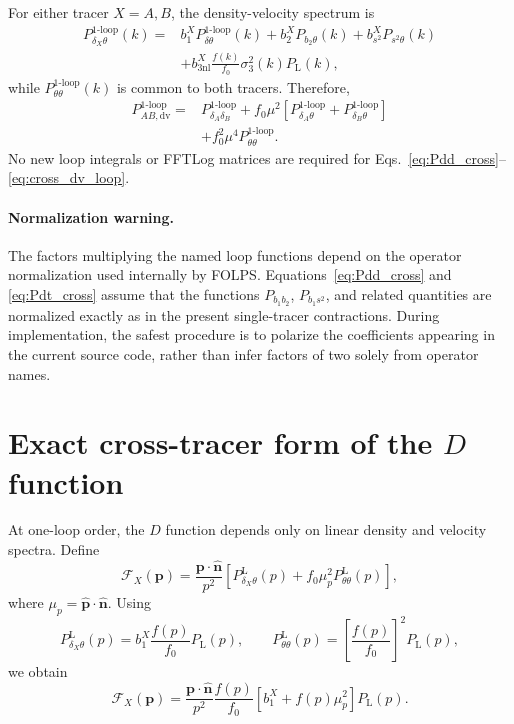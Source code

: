 \documentclass[11pt,a4paper]{article}
\newcommand{\bs}[1]{\boldsymbol{#1}}
\newcommand{\PL}{P_{\mathrm{L}}}
\begin{document}
For either tracer $X=A,B$, the density-velocity spectrum is
\begin{align}
    P_{\delta_X\theta}^{\mathrm{1\mbox{-}loop}}(k)
    ={}&
    b_1^X P_{\delta\theta}^{\mathrm{1\mbox{-}loop}}(k)
    +b_2^X P_{b_2\theta}(k)
    +b_{s^2}^X P_{s^2\theta}(k)
    \nonumber\\
    &+b_{3\mathrm{nl}}^X
    \frac{f(k)}{f_0}
    \sigma_3^2(k)\PL(k),
\label{eq:Pdt_cross}
\end{align}
while $P_{\theta\theta}^{\mathrm{1\mbox{-}loop}}(k)$ is common to both tracers. Therefore,
\begin{align}
    P_{AB,\mathrm{dv}}^{\mathrm{1\mbox{-}loop}}
    ={}&
    P_{\delta_A\delta_B}^{\mathrm{1\mbox{-}loop}}
    +f_0\mu^2
    \left[
        P_{\delta_A\theta}^{\mathrm{1\mbox{-}loop}}
        +P_{\delta_B\theta}^{\mathrm{1\mbox{-}loop}}
    \right]
    \nonumber\\
    &+f_0^2\mu^4P_{\theta\theta}^{\mathrm{1\mbox{-}loop}}.
\label{eq:cross_dv_loop}
\end{align}
No new loop integrals or FFTLog matrices are required for Eqs.~\eqref{eq:Pdd_cross}--\eqref{eq:cross_dv_loop}.

\paragraph{Normalization warning.}
The factors multiplying the named loop functions depend on the operator normalization used internally by FOLPS. Equations~\eqref{eq:Pdd_cross} and \eqref{eq:Pdt_cross} assume that the functions $P_{b_1b_2}$, $P_{b_1s^2}$, and related quantities are normalized exactly as in the present single-tracer contractions. During implementation, the safest procedure is to polarize the coefficients appearing in the current source code, rather than infer factors of two solely from operator names.

\section{Exact cross-tracer form of the $D$ function}
\label{sec:D}

At one-loop order, the $D$ function depends only on linear density and velocity spectra. Define
\begin{equation}
    \mathcal{F}_X(\bs{p})
    =
    \frac{\bs{p}\cdot\hat{\bs{n}}}{p^2}
    \left[
        P_{\delta_X\theta}^{\mathrm{L}}(p)
        +f_0\mu_p^2P_{\theta\theta}^{\mathrm{L}}(p)
    \right],
\label{eq:FX_D}
\end{equation}
where $\mu_p=\hat{\bs{p}}\cdot\hat{\bs{n}}$. Using
\begin{equation}
    P_{\delta_X\theta}^{\mathrm{L}}(p)
    =b_1^X\frac{f(p)}{f_0}\PL(p),
    \qquad
    P_{\theta\theta}^{\mathrm{L}}(p)
    =\left[\frac{f(p)}{f_0}\right]^2\PL(p),
\end{equation}
we obtain
\begin{equation}
    \mathcal{F}_X(\bs{p})
    =
    \frac{\bs{p}\cdot\hat{\bs{n}}}{p^2}
    \frac{f(p)}{f_0}
    \left[b_1^X+f(p)\mu_p^2\right]\PL(p).
\end{equation}
\end{document}
